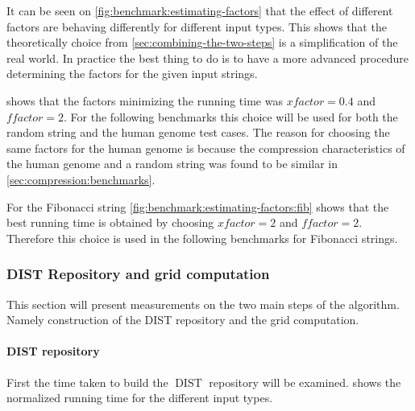 \documentclass[twoside,11pt,openright]{report}
\newcommand{\DIST}{\operatorname{DIST}}
\newcommand{\xfactor}{\ensuremath{\mathit{xfactor}}}
\newcommand{\ffactor}{\ensuremath{\mathit{ffactor}}}
\begin{document}
It can be seen on \cref{fig:benchmark:estimating-factors} that the effect of different factors are behaving differently for different input types. This shows that the theoretically choice from \cref{sec:combining-the-two-steps} is a simplification of the real world. In practice the best thing to do is to have a more advanced procedure determining the factors for the given input strings.

 shows that the factors minimizing the running time was $\xfactor = 0.4$ and $\ffactor = 2$. For the following benchmarks this choice will be used for both the random string and the human genome test cases. The reason for choosing the same factors for the human genome is because the compression characteristics of the human genome and a random string was found to be similar in \cref{sec:compression:benchmarks}.

For the Fibonacci string \cref{fig:benchmark:estimating-factors:fib} shows that the best running time is obtained by choosing $\xfactor = 2$ and $\ffactor = 2$. Therefore this choice is used in the following benchmarks for Fibonacci strings.

\subsubsection{DIST Repository and grid computation}
This section will present measurements on the two main steps of the algorithm. Namely construction of the DIST repository and the grid computation.

\paragraph{DIST repository}
First the time taken to build the $\DIST$ repository will be examined.  shows the normalized running time for the different input types.

\end{document}
